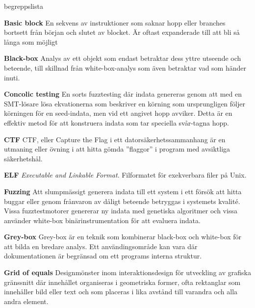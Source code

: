 \begin{labeling}{begreppslista}

    \item[\textbf{Basic block}] En sekvens av instruktioner som saknar
    hopp eller branches bortsett från början och slutet av
    blocket. Är oftast expanderade till att bli så långa som möjligt

    \item [\textbf{Black-box}] Analys av ett objekt som endast betraktar dess
    yttre utseende och beteende, till skillnad från white-box-analys som även
    betraktar vad som händer inuti.

    \item [\textbf{Concolic testing}] En sorts fuzztesting där indata genereras
    genom att med en SMT-lösare lösa ekvationerna som beskriver en körning som
    ursprungligen följer körningen för en seed-indata, men vid ett angivet
    hopp avviker. Detta är en effektiv metod för att konstruera indata som tar
    speciella svår-tagna hopp.

    \item [\textbf{CTF}] CTF, eller Capture the Flag i ett
    datorsäkerhetssammanhang är en utmaning eller övning i
    att hitta gömda ''flaggor'' i program med avsiktliga säkerhetshål.

    \item [\textbf{ELF}] \emph{Executable and Linkable Format}. Filformatet för
    exekverbara filer på Unix.

    \item [\textbf{Fuzzing}] Att slumpmässigt generera indata till ett system i
    ett försök att hitta buggar eller genom frånvaron av dåligt beteende
    betryggas i systemets kvalité. Vissa fuzztestmotorer genererar ny indata
    med genetiska algoritmer och vissa använder white-box binärinstrumentation
    för att evaluera indata.

    \item [\textbf{Grey-box}] Grey-box är en teknik som kombinerar black-box och
    white-box för att bilda en bredare analys. Ett användingsområde kan vara där
    dokumentationen är begränsad om ett programs interna struktur.

    \item [\textbf{Grid of equals}] Designmönster inom interaktionsdesign för
    utveckling av grafiska gränssnitt där innehållet organiseras i geometriska
    former, ofta rektanglar som innehåller bild eller text och som placeras i
    lika avstånd till varandra och alla andra element.


\end{labeling}
